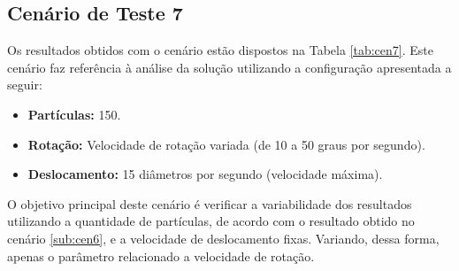 \subsection{Cenário de Teste 7}
\label{sub:cen7}

Os resultados obtidos com o cenário estão dispostos na Tabela \ref{tab:cen7}. Este cenário faz referência à análise da solução
utilizando a configuração apresentada a seguir:

\begin{itemize}
  \item \textbf{Partículas:} 150.
  \item \textbf{Rotação:} Velocidade de rotação variada (de 10 a 50 graus por segundo).
  \item \textbf{Deslocamento:} 15 diâmetros por segundo (velocidade máxima).
\end{itemize}

O objetivo principal deste cenário é verificar a variabilidade dos resultados utilizando a quantidade de partículas, de
acordo com o resultado obtido no cenário \ref{sub:cen6}, e a velocidade de deslocamento fixas. Variando, dessa forma, apenas
o parâmetro relacionado a velocidade de rotação.

